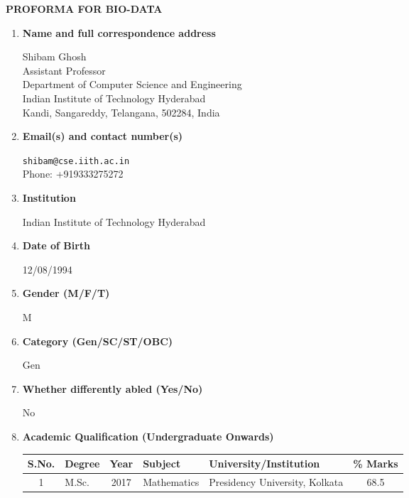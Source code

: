 \documentclass[11pt,a4paper]{article}
\begin{document}
\begin{center}
    {\Large\bfseries PROFORMA FOR BIO-DATA}
\end{center}

\vspace{0.5cm}

\begin{enumerate}

\item \textbf{Name and full correspondence address}

Shibam Ghosh\\
Assistant Professor\\
Department of Computer Science and Engineering\\
Indian Institute of Technology Hyderabad\\
Kandi, Sangareddy, Telangana, 502284, India

\item \textbf{Email(s) and contact number(s)}

\texttt{shibam@cse.iith.ac.in}\\
Phone: +919333275272

\item \textbf{Institution}

Indian Institute of Technology Hyderabad

\item \textbf{Date of Birth}

12/08/1994

\item \textbf{Gender (M/F/T)}

M

\item \textbf{Category (Gen/SC/ST/OBC)}

Gen

\item \textbf{Whether differently abled (Yes/No)}

No

\item \textbf{Academic Qualification (Undergraduate Onwards)}

\begin{center}
\begin{tabular}{|c|p{1.4cm}|c|p{3cm}|p{5cm}|c|}
\hline
S.No. & Degree & Year & Subject &
University/Institution & \% Marks \\
\hline

1 &
M.Sc. &
2017 &
Mathematics &
Presidency University, Kolkata &
68.5 \\
\hline


\end{tabular}
\end{center}
\end{enumerate}
\end{document}
